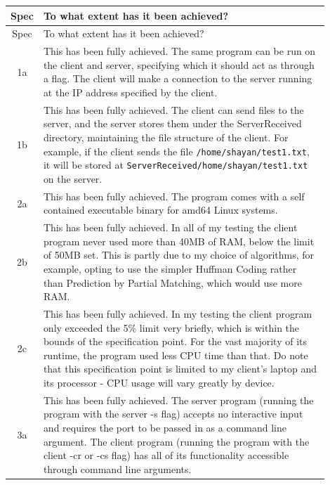 \documentclass[../main.tex]{subfiles}
\begin{document}
\begin{longtable}{|c|p{0.9\linewidth}|}
\hline
Spec & To what extent has it been achieved? \\
\hline
\endfirsthead

\hline
Spec & To what extent has it been achieved? \\
\hline
\endhead

\hline
\endfoot

\hline
\endlastfoot

1a & This has been fully achieved. The same program can be run on the client and server, specifying which it should act as through a flag. The client will make a connection to the server running at the IP address specified by the client. \\
\hline

1b & This has been fully achieved. The client can send files to the server, and the server stores them under the ServerReceived directory, maintaining the file structure of the client. For example, if the client sends the file \texttt{/home/shayan/test1.txt}, it will be stored at \texttt{ServerReceived/home/shayan/test1.txt} on the server. \\
\hline

2a & This has been fully achieved. The program comes with a self contained executable binary for amd64 Linux systems. \\
\hline

2b & This has been fully achieved. In all of my testing the client program never used more than 40MB of RAM, below the limit of 50MB set. This is partly due to my choice of algorithms, for example, opting to use the simpler Huffman Coding rather than Prediction by Partial Matching, which would use more RAM. \\
\hline

2c & This has been fully achieved. In my testing the client program only exceeded the 5\% limit very briefly, which is within the bounds of the specification point. For the vast majority of its runtime, the program used less CPU time than that. Do note that this specification point is limited to my client’s laptop and its processor - CPU usage will vary greatly by device. \\
\hline

3a & This has been fully achieved. The server program (running the program with the server -s flag) accepts no interactive input and requires the port to be passed in as a command line argument. The client program (running the program with the client -cr or -cs flag) has all of its functionality accessible through command line arguments. \\
\hline


\end{longtable}
\end{document}

